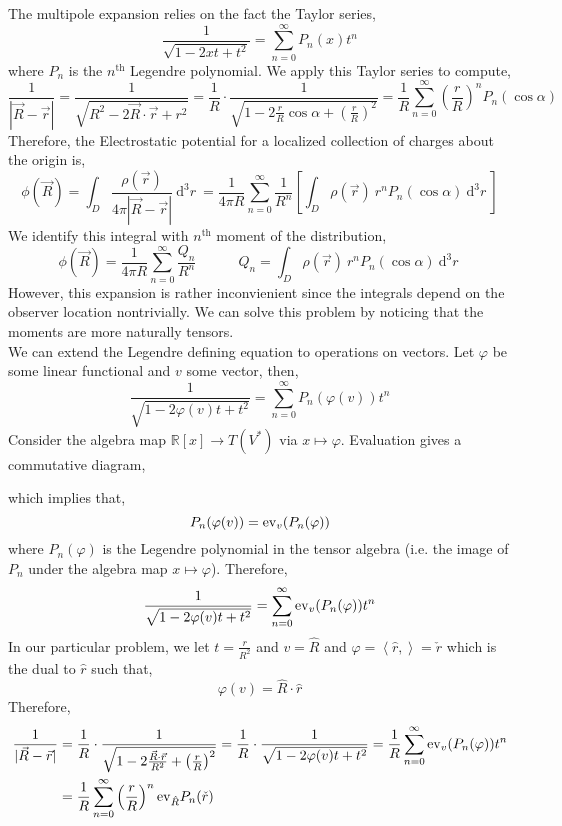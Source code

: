 \documentclass[12pt]{extarticle}
\newcommand{\R}{\mathbb{R}}
\newcommand{\dn}[2]{ \mathrm{d}^{#1} #2 \:}
\theoremstyle{definition}
\newcommand{\inner}[2]{\left< #1, #2 \right>}
\begin{document}
The multipole expansion relies on the fact the Taylor series,
\[ \frac{1}{\sqrt{1 - 2 x t + t^2}} = \sum_{n = 0}^\infty P_n(x) t^n \]
where $P_n$ is the $n^{\text{th}}$ Legendre polynomial. We apply this Taylor series to compute,
\[ \frac{1}{|\vec{R} - \vec{r}|} = \frac{1}{\sqrt{R^2 - 2 \vec{R} \cdot \vec{r} + r^2}} = \frac{1}{R} \cdot \frac{1}{\sqrt{1 - 2 \frac{r}{R} \cos{\alpha} + \left( \frac{r}{R} \right)^2}} = \frac{1}{R} \sum_{n = 0}^\infty \left( \frac{r}{R} \right)^n P_n(\cos{\alpha}) \]
Therefore, the Electrostatic potential for a localized collection of charges about the origin is,
\[ \phi(\vec{R}) = \int_D \frac{\rho(\vec{r})}{4 \pi |\vec{R} - \vec{r}|} \: \dn{3}{r} =  \frac{1}{4 \pi R} \sum_{n = 0}^\infty  \frac{1}{R^n} \left[ \int_D \rho(\vec{r}) \: r^n P_n(\cos{\alpha}) \: \dn{3}{r} \right]  \]
We identify this integral with $n^\text{th}$ moment of the distribution,
\[ \phi(\vec{R}) = \frac{1}{4 \pi R} \sum_{n = 0}^\infty \frac{Q_n}{R^n} \quad \quad \quad Q_n = \int_D \rho(\vec{r}) \: r^n P_n(\cos{\alpha}) \: \dn{3}{r}  \]
However, this expansion is rather inconvienient since the integrals depend on the observer location nontrivially. We can solve this problem by noticing that the moments are more naturally tensors. 
\bigskip\\
We can extend the Legendre defining equation to operations on vectors. Let $\varphi$ be some linear functional and $v$ some vector, then,
\[ \frac{1}{\sqrt{1 - 2 \varphi(v) t + t^2}} = \sum_{n = 0}^\infty P_n(\varphi(v)) t^n \]
Consider the algebra map $\R[x] \to T(V^*)$ via $x \mapsto \varphi$. Evaluation gives a commutative diagram,
\begin{center}
\end{center}
which implies that,
\[ P_n(\varphi(v)) = \mathrm{ev}_v(P_n(\varphi)) \]
where $P_n(\varphi)$ is the Legendre polynomial in the tensor algebra (i.e. the image of $P_n$ under the algebra map $x \mapsto \varphi$). Therefore, 
\[ \frac{1}{\sqrt{1 - 2 \varphi(v) t + t^2}} = \sum_{n = 0}^\infty \mathrm{ev}_v(P_n(\varphi)) t^n \] 
In our particular problem, we let $t = \frac{r}{R^2}$ and $v = \hat{R}$ and $\varphi = \inner{\hat{r}}{} = \check{r}$ which is the dual to $\hat{r}$ such that,
\[ \varphi(v) = \hat{R} \cdot \hat{r} \]
Therefore,
\begin{align*}
\frac{1}{|\vec{R} - \vec{r}|} & = \frac{1}{R} \cdot \frac{1}{\sqrt{1 - 2 \frac{\vec{R} \cdot \vec{r}}{R^2} + \left( \frac{r}{R} \right)^2}} = \frac{1}{R} \cdot \frac{1}{\sqrt{1 - 2 \varphi(v) t  + t^2}} = \frac{1}{R} \sum_{n = 0}^\infty \mathrm{ev}_v(P_n(\varphi)) t^n 
\\
& = \frac{1}{R} \sum_{n = 0}^\infty \left( \frac{r}{R} \right)^n \mathrm{ev}_{\hat{R}}P_n(\check{r})
\end{align*}
\end{document}
